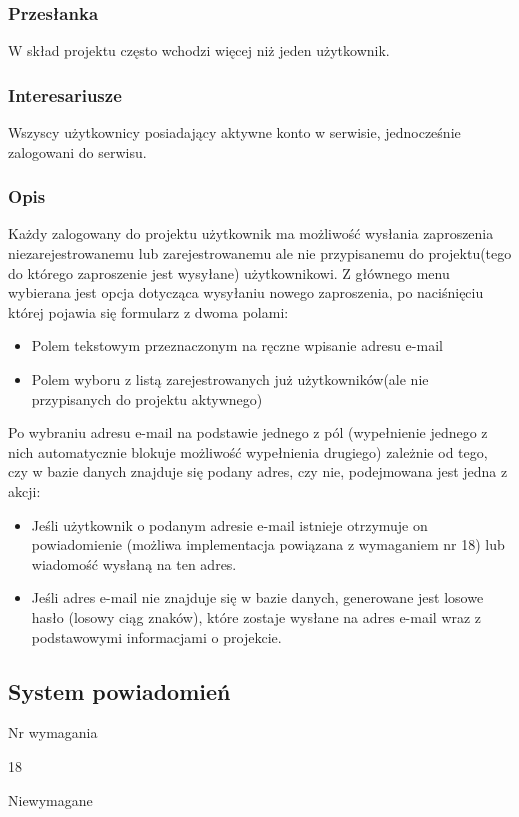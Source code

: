 \documentclass[eng,printmode]{mgr}
\begin{document}
\subsubsection{Przesłanka}
W skład projektu często wchodzi więcej niż jeden użytkownik.

\subsubsection{Interesariusze}
Wszyscy użytkownicy posiadający aktywne konto w serwisie, jednocześnie zalogowani do serwisu.

\subsubsection{Opis}
Każdy zalogowany do projektu użytkownik ma możliwość wysłania zaproszenia niezarejestrowanemu lub zarejestrowanemu ale nie przypisanemu do projektu(tego do którego zaproszenie jest wysyłane) użytkownikowi. Z głównego menu wybierana jest opcja dotycząca wysyłaniu nowego zaproszenia, po naciśnięciu której pojawia się formularz z dwoma polami:
\begin{itemize}
  \item[--] Polem tekstowym przeznaczonym na ręczne wpisanie adresu e-mail
  \item[--] Polem wyboru z listą zarejestrowanych już użytkowników(ale nie przypisanych do projektu aktywnego)
\end{itemize}
Po wybraniu adresu e-mail na podstawie jednego z pól (wypełnienie jednego z nich automatycznie blokuje możliwość wypełnienia drugiego) zależnie od tego, czy w bazie danych znajduje się podany adres, czy nie, podejmowana jest jedna z akcji:
\begin{itemize}
  \item[--] Jeśli użytkownik o podanym adresie e-mail istnieje otrzymuje on powiadomienie (możliwa implementacja powiązana z wymaganiem nr 18) lub wiadomość wysłaną na ten adres.
  \item[--] Jeśli adres e-mail nie znajduje się w bazie danych, generowane jest losowe hasło (losowy ciąg znaków), które zostaje  wysłane na adres e-mail wraz z podstawowymi informacjami o projekcie.
\end{itemize}

\subsection{System powiadomień}
\begin{labeling}{Nr wymagania}
\item [Nr wymagania:] 18
\item [Priorytet:] Niewymagane
\end{labeling}
\end{document}
